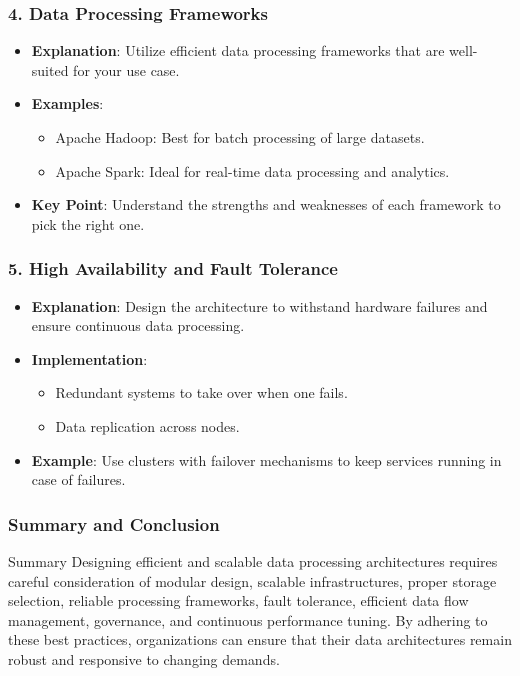 \documentclass[aspectratio=169]{beamer}
\begin{document}
\begin{frame}[fragile]
    \frametitle{4. Data Processing Frameworks}
    \begin{itemize}
        \item \textbf{Explanation}: 
            Utilize efficient data processing frameworks that are well-suited for your use case.
        \item \textbf{Examples}:
            \begin{itemize}
                \item Apache Hadoop: Best for batch processing of large datasets.
                \item Apache Spark: Ideal for real-time data processing and analytics.
            \end{itemize}
        \item \textbf{Key Point}: 
            Understand the strengths and weaknesses of each framework to pick the right one.
    \end{itemize}
\end{frame}

\begin{frame}[fragile]
    \frametitle{5. High Availability and Fault Tolerance}
    \begin{itemize}
        \item \textbf{Explanation}: 
            Design the architecture to withstand hardware failures and ensure continuous data processing.
        \item \textbf{Implementation}:
            \begin{itemize}
                \item Redundant systems to take over when one fails.
                \item Data replication across nodes.
            \end{itemize}
        \item \textbf{Example}: 
            Use clusters with failover mechanisms to keep services running in case of failures.
    \end{itemize}
\end{frame}

\begin{frame}[fragile]
    \frametitle{Summary and Conclusion}
    \begin{block}{Summary}
        Designing efficient and scalable data processing architectures requires careful consideration of modular design, scalable infrastructures, proper storage selection, reliable processing frameworks, fault tolerance, efficient data flow management, governance, and continuous performance tuning. By adhering to these best practices, organizations can ensure that their data architectures remain robust and responsive to changing demands.
    \end{block}
\end{frame}
\end{document}
